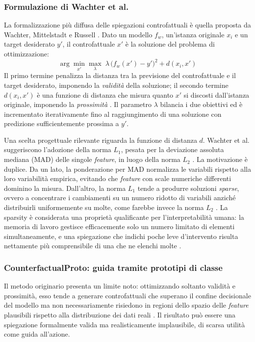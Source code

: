 \subsubsection{Formulazione di Wachter et al.}

La formalizzazione più diffusa delle spiegazioni controfattuali è quella proposta da Wachter, Mittelstadt e Russell \cite{wachter2017counterfactual}. Dato un modello $f_w$, un'istanza originale $x_i$ e un target desiderato $y'$, il controfattuale $x'$ è la soluzione del problema di ottimizzazione:
\[
\arg\min_{x'} \max_{\lambda} \; \lambda \, \bigl(f_w(x') - y'\bigr)^2 + d(x_i, x')
\]
Il primo termine penalizza la distanza tra la previsione del controfattuale e il target desiderato, imponendo la \textit{validità} della soluzione; il secondo termine $d(x_i, x')$ è una funzione di distanza che misura quanto $x'$ si discosti dall'istanza originale, imponendo la \textit{prossimità} \cite{wachter2017counterfactual}. Il parametro $\lambda$ bilancia i due obiettivi ed è incrementato iterativamente fino al raggiungimento di una soluzione con predizione sufficientemente prossima a $y'$.

Una scelta progettuale rilevante riguarda la funzione di distanza $d$. Wachter et al. suggeriscono l'adozione della norma $L_1$, pesata per la deviazione assoluta mediana (MAD) delle singole \textit{feature}, in luogo della norma $L_2$ \cite{wachter2017counterfactual}. La motivazione è duplice. Da un lato, la ponderazione per MAD normalizza le variabili rispetto alla loro variabilità empirica, evitando che \textit{feature} con scale numeriche differenti dominino la misura. Dall'altro, la norma $L_1$ tende a produrre soluzioni \textit{sparse}, ovvero a concentrare i cambiamenti su un numero ridotto di variabili anziché distribuirli uniformemente su molte, come farebbe invece la norma $L_2$ \cite{wachter2017counterfactual}. La sparsity è considerata una proprietà qualificante per l'interpretabilità umana: la memoria di lavoro gestisce efficacemente solo un numero limitato di elementi simultaneamente, e una spiegazione che indichi poche leve d'intervento risulta nettamente più comprensibile di una che ne elenchi molte \cite{wachter2017counterfactual}.

\subsubsection{CounterfactualProto: guida tramite prototipi di classe}

Il metodo originario presenta un limite noto: ottimizzando soltanto validità e prossimità, esso tende a generare controfattuali che superano il confine decisionale del modello ma non necessariamente risiedono in regioni dello spazio delle \textit{feature} plausibili rispetto alla distribuzione dei dati reali \cite{vanlooveren2021counterfactualproto}. Il risultato può essere una spiegazione formalmente valida ma realisticamente implausibile, di scarsa utilità come guida all'azione.

